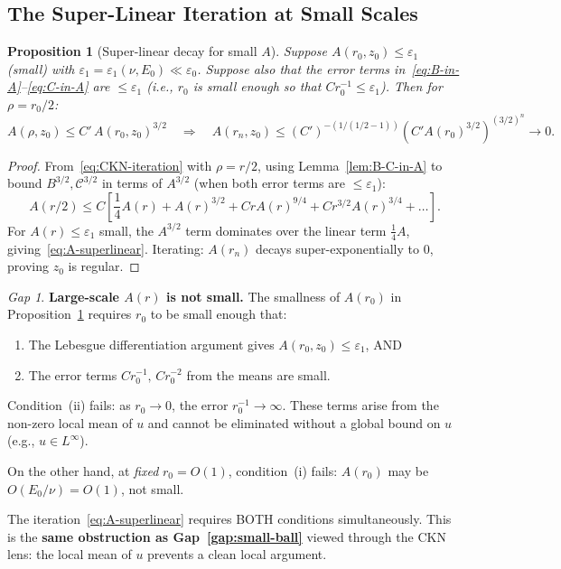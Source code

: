 \documentclass[11pt]{article}
\newtheorem{proposition}[theorem]{Proposition}
\theoremstyle{definition}
\theoremstyle{remark}
\newtheorem{gap}[theorem]{\color{red}Gap}
\begin{document}
\subsection{The Super-Linear Iteration at Small Scales}

\begin{proposition}[Super-linear decay for small $A$]\label{prop:superlinear}
  Suppose $A(r_0,z_0)\leq\varepsilon_1$ (small) with
  $\varepsilon_1 = \varepsilon_1(\nu,E_0)\ll\varepsilon_0$.
  Suppose also that the error terms in~\eqref{eq:B-in-A}--\eqref{eq:C-in-A}
  are $\leq\varepsilon_1$ (i.e., $r_0$ is small enough so that
  $C r_0^{-1}\leq\varepsilon_1$).  Then for $\rho = r_0/2$:
  \begin{equation}\label{eq:A-superlinear}
    A(\rho,z_0) \leq C'\,A(r_0,z_0)^{3/2}
    \quad\Rightarrow\quad
    A(r_n,z_0) \leq (C')^{-(1/(1/2-1))} (C'A(r_0)^{3/2})^{(3/2)^n}\to 0.
  \end{equation}
\end{proposition}

\begin{proof}
  From~\eqref{eq:CKN-iteration} with $\rho=r/2$, using
  Lemma~\ref{lem:B-C-in-A} to bound $B^{3/2},\mathcal{C}^{3/2}$
  in terms of $A^{3/2}$ (when both error terms are $\leq\varepsilon_1$):
  \[
    A(r/2) \leq C\left[\frac{1}{4}A(r) + A(r)^{3/2}
      + CrA(r)^{9/4} + Cr^{3/2}A(r)^{3/4} + \ldots\right].
  \]
  For $A(r)\leq\varepsilon_1$ small, the $A^{3/2}$ term dominates over
  the linear term $\frac{1}{4}A$, giving~\eqref{eq:A-superlinear}.
  Iterating: $A(r_n)$ decays super-exponentially to $0$, proving
  $z_0$ is regular.
\end{proof}

\begin{gap}\label{gap:large-scale-A}
  \textbf{Large-scale $A(r)$ is not small.}
  The smallness of $A(r_0)$ in Proposition~\ref{prop:superlinear}
  requires $r_0$ to be small enough that:
  \begin{enumerate}[label=(\roman*)]
  \item The Lebesgue differentiation argument gives $A(r_0,z_0)\leq\varepsilon_1$,
    AND
  \item The error terms $Cr_0^{-1},\,Cr_0^{-2}$ from the means are small.
  \end{enumerate}
  Condition~(ii) fails: as $r_0\to 0$, the error $r_0^{-1}\to\infty$.
  These terms arise from the non-zero local mean of $u$ and cannot be
  eliminated without a global bound on $u$ (e.g., $u\in L^\infty$).

  On the other hand, at \emph{fixed} $r_0=O(1)$, condition~(i) fails:
  $A(r_0)$ may be $O(E_0/\nu)=O(1)$, not small.

  The iteration~\eqref{eq:A-superlinear} requires BOTH conditions simultaneously.
  This is the \textbf{same obstruction as Gap~\ref{gap:small-ball}} viewed
  through the CKN lens: the local mean of $u$ prevents a clean local argument.
\end{gap}
\end{document}
